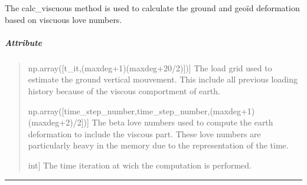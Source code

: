 \documentclass[letterpaper,10pt,english]{sphinxmanual}
\begin{document}
\begin{fulllineitems}
\label{\detokenize{GRID_doc/LOAD_TIME_GRID_doc:SL_C0de.grid.LOAD_TIME_GRID.calc_viscuous}}
\pysigstartsignatures
{}
\pysigstopsignatures
\sphinxAtStartPar
The \label{\detokenize{GRID_doc/LOAD_TIME_GRID_doc:calc-viscuous}}calc\_viscuous method is used to calculate the ground and geoïd deformation based on viscuous love numbers.


\subparagraph{Attribute}
\label{\detokenize{GRID_doc/LOAD_TIME_GRID_doc:attribute}}\begin{quote}
\begin{description}
\sphinxlineitem{sdelL}{[}np.array({[}t\_it,(maxdeg+1)(maxdeg+20/2){]}){]}
\sphinxAtStartPar
The load grid used to estimate the ground vertical mouvement. This include all previous loading history because of the viscous comportment of earth.

\sphinxlineitem{beta}{[}np.array({[}time\_step\_number,time\_step\_number,(maxdeg+1)(maxdeg+2)/2{]}){]}
\sphinxAtStartPar
The beta love numbers used to compute the earth deformation to include the viscous part. These love numbers are particularly heavy in the memory due to the representation of the time.

\sphinxlineitem{t\_it}{[}int{]}
\sphinxAtStartPar
The time iteration at wich the computation is performed.

\end{description}
\end{quote}

\end{fulllineitems}



\bigskip\hrule\bigskip

\end{document}
